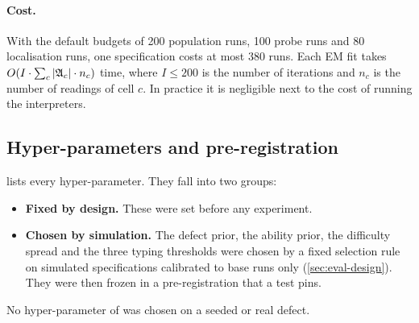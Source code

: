 \paragraph{Cost.} With the default budgets of 200 population runs, 100 probe runs and 80 localisation runs, one specification costs at most 380 runs. Each EM fit takes $O(I\cdot\sum_c|\mathfrak{A}_c|\cdot n_c)$ time, where $I\le200$ is the number of iterations and $n_c$ is the number of readings of cell $c$. In practice it is negligible next to the cost of running the interpreters.

\subsection{Hyper-parameters and pre-registration}
\label{sec:approach-hparams}

 lists every hyper-parameter. They fall into two groups:
\begin{itemize}[leftmargin=*]
\item \textbf{Fixed by design.} These were set before any experiment.
\item \textbf{Chosen by simulation.} The defect prior, the ability prior, the difficulty spread and the three typing thresholds were chosen by a fixed selection rule on simulated specifications calibrated to base runs only (\cref{sec:eval-design}). They were then frozen in a pre-registration that a test pins.
\end{itemize}
No hyper-parameter of \specdx was chosen on a seeded or real defect.

